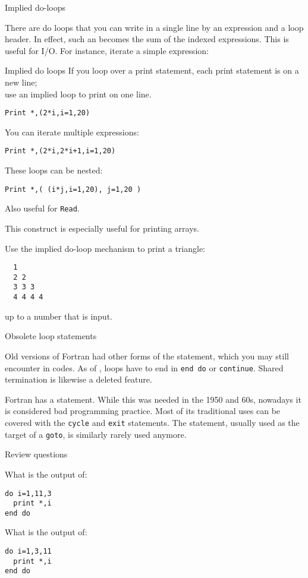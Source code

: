 {Implied do-loops}
\label{sec:f-impdo}

There are do loops that you can write in a single line by an
expression and a loop header. In effect, such an
 becomes the sum of the indexed
expressions. This is useful
for I/O. For instance, iterate a simple expression:

\begin{block}{Implied do loops}
  \label{sl:implieddo}
  If you loop over a print statement, each print statement is on a new line;\\
  use an implied loop to print on one line.
\begin{lstlisting}
Print *,(2*i,i=1,20)
\end{lstlisting}
You can iterate multiple expressions:
\begin{lstlisting}
Print *,(2*i,2*i+1,i=1,20)
\end{lstlisting}
These loops can be nested:
\begin{lstlisting}
Print *,( (i*j,i=1,20), j=1,20 )
\end{lstlisting}
Also useful for \lstinline+Read+.
\end{block}

This construct is especially useful for printing arrays.

\begin{exercise}
  \label{ex:impl-triangle}
  Use the implied do-loop mechanism to print a triangle:
\begin{lstlisting}
  1
  2 2
  3 3 3
  4 4 4 4
\end{lstlisting}
  up to a number that is input.
\end{exercise}

 {Obsolete loop statements}

Old versions of Fortran had other forms of the  statement,
which you may still encounter in codes.
As of ,  loops have to end
in \lstinline{end do} or \lstinline{continue}.
Shared termination is likewise a deleted feature.

Fortran has a  statement.
While this was needed in the 1950 and 60s, nowadays
it is considered bad programming practice.
Most of its traditional uses can be covered
with the \lstinline{cycle} and \lstinline{exit} statements.
The  statement,
usually used as the target of a \lstinline{goto},
is similarly rarely used anymore.

 {Review questions}

\begin{exercise}
  \label{ex:floop-inf}
  What is the output of:
\begin{lstlisting}
do i=1,11,3
  print *,i
end do
\end{lstlisting}
What is the output of:
\begin{lstlisting}
do i=1,3,11
  print *,i
end do
\end{lstlisting}
\end{exercise}
